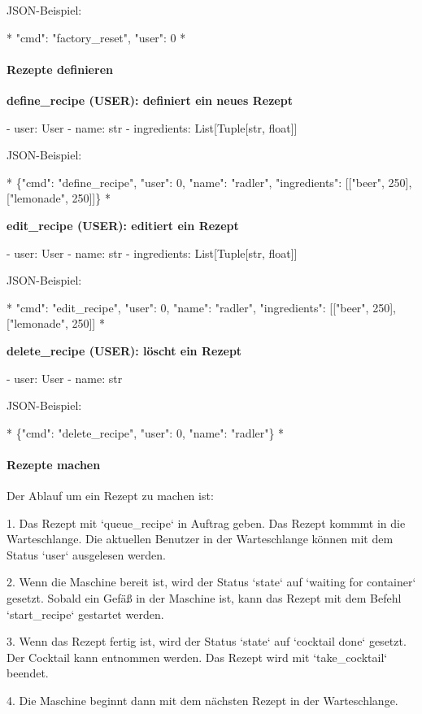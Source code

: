 JSON-Beispiel:

*
{"cmd": "factory\_reset", "user": 0}
*

\paragraph{ Rezepte definieren}

\textbf{ define\_recipe (USER): definiert ein neues Rezept}

- user: User
- name: str
- ingredients: List[Tuple[str, float]]

JSON-Beispiel:

*
\{"cmd": "define\_recipe", "user": 0, "name": "radler", "ingredients": [["beer", 250], ["lemonade", 250]]\}
*

\textbf{ edit\_recipe (USER): editiert ein Rezept}

- user: User
- name: str
- ingredients: List[Tuple[str, float]]

JSON-Beispiel:

*
{"cmd": "edit\_recipe", "user": 0, "name": "radler", "ingredients": [["beer", 250], ["lemonade", 250]]}
*

\textbf{ delete\_recipe (USER): löscht ein Rezept}

- user: User
- name: str

JSON-Beispiel:

*
\{"cmd": "delete\_recipe", "user": 0, "name": "radler"\}
*

\paragraph{ Rezepte machen}

Der Ablauf um ein Rezept zu machen ist:

1. Das Rezept mit `queue\_recipe` in Auftrag geben. Das Rezept kommmt in die Warteschlange. Die aktuellen Benutzer in der Warteschlange können mit dem Status `user` ausgelesen werden.

2. Wenn die Maschine bereit ist, wird der Status `state` auf `waiting for container` gesetzt. Sobald ein Gefäß in der Maschine ist, kann das Rezept mit dem Befehl `start\_recipe` gestartet werden.

3. Wenn das Rezept fertig ist, wird der Status `state` auf `cocktail done` gesetzt. Der Cocktail kann entnommen werden. Das Rezept wird mit `take\_cocktail` beendet.

4. Die Maschine beginnt dann mit dem nächsten Rezept in der Warteschlange.


